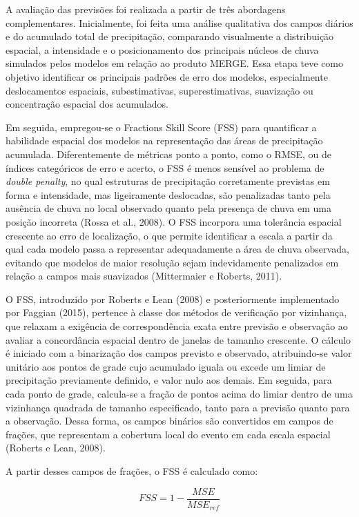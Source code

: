 \documentclass[12pt,a4paper,oneside]{book}
\begin{document}
A avaliação das previsões foi realizada a partir de três abordagens complementares. Inicialmente, foi feita uma análise qualitativa dos campos diários e do acumulado total de precipitação, comparando visualmente a distribuição espacial, a intensidade e o posicionamento dos principais núcleos de chuva simulados pelos modelos em relação ao produto MERGE. Essa etapa teve como objetivo identificar os principais padrões de erro dos modelos, especialmente deslocamentos espaciais, subestimativas, superestimativas, suavização ou concentração espacial dos acumulados.

Em seguida, empregou-se o Fractions Skill Score (FSS) para quantificar a habilidade espacial dos modelos na representação das áreas de precipitação acumulada. Diferentemente de métricas ponto a ponto, como o RMSE, ou de índices categóricos de erro e acerto, o FSS é menos sensível ao problema de \textit{double penalty}, no qual estruturas de precipitação corretamente previstas em forma e intensidade, mas ligeiramente deslocadas, são penalizadas tanto pela ausência de chuva no local observado quanto pela presença de chuva em uma posição incorreta (Rossa et al., 2008). O FSS incorpora uma tolerância espacial crescente ao erro de localização, o que permite identificar a escala a partir da qual cada modelo passa a representar adequadamente a área de chuva observada, evitando que modelos de maior resolução sejam indevidamente penalizados em relação a campos mais suavizados (Mittermaier e Roberts, 2011).

O FSS, introduzido por Roberts e Lean (2008) e posteriormente implementado por Faggian (2015), pertence à classe dos métodos de verificação por vizinhança, que relaxam a exigência de correspondência exata entre previsão e observação ao avaliar a concordância espacial dentro de janelas de tamanho crescente. O cálculo é iniciado com a binarização dos campos previsto e observado, atribuindo-se valor unitário aos pontos de grade cujo acumulado iguala ou excede um limiar de precipitação previamente definido, e valor nulo aos demais. Em seguida, para cada ponto de grade, calcula-se a fração de pontos acima do limiar dentro de uma vizinhança quadrada de tamanho especificado, tanto para a previsão quanto para a observação. Dessa forma, os campos binários são convertidos em campos de frações, que representam a cobertura local do evento em cada escala espacial (Roberts e Lean, 2008).

A partir desses campos de frações, o FSS é calculado como:

\[
FSS = 1 - \frac{MSE}{MSE_{ref}}
\]
\end{document}
